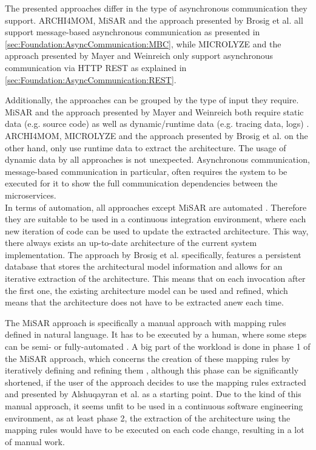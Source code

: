 The presented approaches differ in the type of asynchronous communication they support.
ARCHI4MOM, MiSAR and the approach presented by Brosig et al. all support message-based asynchronous communication as presented in \autoref{sec:Foundation:AsyncCommunication:MBC}, while MICROLYZE and the approach presented by Mayer and Weinreich only support asynchronous communication via HTTP REST as explained in \autoref{sec:Foundation:AsyncCommunication:REST}.

Additionally, the approaches can be grouped by the type of input they require.
MiSAR and the approach presented by Mayer and Weinreich both require static data (e.g. source code) as well as dynamic/runtime data (e.g. tracing data, logs) \cite{Alshuqayran2018MiSAR,Mayer2018}.
ARCHI4MOM, MICROLYZE and the approach presented by Brosig et al. on the other hand, only use runtime data to extract the architecture.
The usage of dynamic data by all approaches is not unexpected.
Asynchronous communication, message-based communication in particular, often requires the system to be executed for it to show the full communication dependencies between the microservices. %
\\

In terms of automation, all approaches except MiSAR are automated \cite{Singh2022ARCHI4MOM,Brosig2011,Mayer2018,Kleehaus2018}.
Therefore they are suitable to be used in a continuous integration environment, where each new iteration of code can be used to update the extracted architecture.
This way, there always exists an up-to-date architecture of the current system implementation.
The approach by Brosig et al. specifically, features a persistent database that stores the architectural model information \cite{Brosig2011} and allows for an iterative extraction of the architecture.
This means that on each invocation after the first one, the existing architecture model can be used and refined, which means that the architecture does not have to be extracted anew each time.

The MiSAR approach is specifically a manual approach with mapping rules defined in natural language.
It has to be executed by a human, where some steps can be semi- or fully-automated \cite{Alshuqayran2020Thesis}.
A big part of the workload is done in phase 1 of the MiSAR approach, which concerns the creation of these mapping rules by iteratively defining and refining them \cite{Alshuqayran2018MiSAR}, although this phase can be significantly shortened, if the user of the approach decides to use the mapping rules extracted and presented by Alshuqayran et al. as a starting point.
Due to the kind of this manual approach, it seems unfit to be used in a continuous software engineering environment, as at least phase 2, the extraction of the architecture using the mapping rules would have to be executed on each code change, resulting in a lot of manual work.
\\

